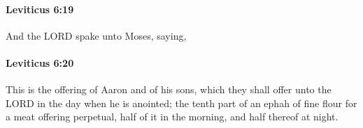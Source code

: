 		\paragraph{Leviticus 6:19} %
			\label{LEVITICUS-6-19}

			And the LORD spake unto Moses, saying,


		\paragraph{Leviticus 6:20} %
			\label{LEVITICUS-6-20}

			This is the offering of Aaron and of his sons, which they shall offer unto the LORD in the day when he is anointed; the tenth part of an ephah of fine flour for a meat offering perpetual, half of it in the morning, and half thereof at night.


